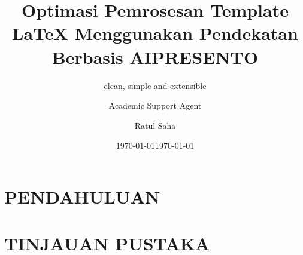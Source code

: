 \documentclass{beamer}
\title{Optimasi Pemrosesan Template LaTeX Menggunakan Pendekatan Berbasis AI}
\author{Academic Support Agent}
\date{\today}
\begin{document}
\maketitle

\begin{abstract}

\end{abstract}

\chapter{PENDAHULUAN}


\chapter{TINJAUAN PUSTAKA}



\usepackage{config/presento}



\title{PRESENTO}
\subtitle{clean, simple and extensible}
\author{Ratul Saha}
\date{\today}
\end{document}
